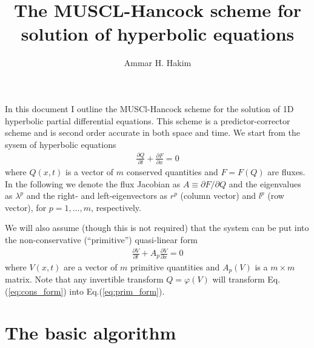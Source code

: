 \documentclass[11pt, reqno]{amsart}
\title{The MUSCL-Hancock scheme for solution of hyperbolic equations}%
\author{Ammar H. Hakim}%
\date{}
\newcommand{\eqr}[1]{Eq.\thinspace(#1)}
\newcommand{\pfrac}[2]{\frac{\partial #1}{\partial #2}}
\newcommand{\pfracb}[2]{\partial #1/\partial #2}
\theoremstyle{definition}
\begin{document}

\maketitle

In this document I outline the MUSCl-Hancock scheme for the solution
of 1D hyperbolic partial differential equations. This scheme is a
predictor-corrector scheme and is second order accurate in both space
and time. We start from the sysem of hyperbolic equations
\begin{align}
  \pfrac{Q}{t} + \pfrac{F}{x} = 0 \label{eq:cons_form}
\end{align}
where $Q(x,t)$ is a vector of $m$ conserved quantities and $F=F(Q)$
are fluxes. In the following we denote the flux Jacobian as
$A\equiv\pfracb{F}{Q}$ and the eigenvalues as $\lambda^p$ and the
right- and left-eigenvectors as $r^p$ (column vector) and $l^p$ (row
vector), for $p=1,\ldots,m$, respectively.

We will also assume (though this is not required) that the system can
be put into the non-conservative (``primitive'') quasi-linear form
\begin{align}
  \pfrac{V}{t} + A_p\pfrac{V}{x} = 0 \label{eq:prim_form}
\end{align}
where $V(x,t)$ are a vector of $m$ primitive quantities and $A_p(V)$
is a $m\times m$ matrix. Note that any invertible transform
$Q=\varphi(V)$ will transform \eqr{\ref{eq:cons_form}} into
\eqr{\ref{eq:prim_form}}.

\section{The basic algorithm}
\end{document}
